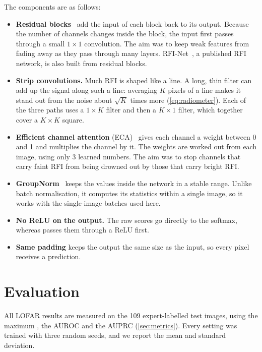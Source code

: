 The components are as follows:
\begin{itemize}
  \item \textbf{Residual blocks}~\cite{he2016} add the input of each block
    back to its output. Because the number of channels changes inside the block,
    the input first passes through a small $1\times1$ convolution. The aim was to
    keep weak features from fading away as they pass through many layers.
    RFI-Net~\cite{yang2020rfinet}, a published RFI network, is also built from
    residual blocks.
  \item \textbf{Strip convolutions.} Much RFI is shaped like a line. A long, thin
    filter can add up the signal along such a line: averaging $K$ pixels of a
    line makes it stand out from the noise about $\sqrt{K}$ times more
    (\cref{eq:radiometer}). Each of the three paths uses a $1\times K$ filter
    and then a $K\times1$ filter, which together cover a $K\times K$ square.
  \item \textbf{Efficient channel attention} (ECA)~\cite{wang2020eca} gives
    each channel a weight between 0 and 1 and multiplies the channel by it. The
    weights are worked out from each image, using only 3 learned numbers. The
    aim was to stop channels that carry faint RFI from being drowned out by
    those that carry bright RFI.
  \item \textbf{GroupNorm}~\cite{wu2018groupnorm} keeps the values inside
    the network in a stable range. Unlike batch normalisation, it computes its
    statistics within a single image, so it works with the single-image batches
    used here.
  \item \textbf{No ReLU on the output.} The raw scores go directly to the
    softmax, whereas \tfunet{} passes them through a ReLU first.
  \item \textbf{Same padding} keeps the output the same size as the input, so
    every pixel receives a prediction.
\end{itemize}

\section{Evaluation}
All LOFAR results are measured on the 109 expert-labelled test images, using
the maximum \Fone{}, the AUROC and the AUPRC (\cref{sec:metrics}). Every setting was
trained with three random seeds, and we report the mean and standard deviation.
